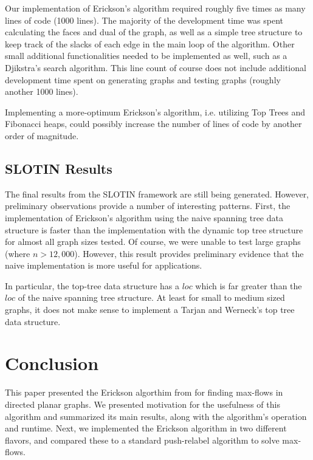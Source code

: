 \documentclass[12pt]{article}
\begin{document}
Our implementation of Erickson's algorithm required roughly five times as many lines of code (1000 lines).  The majority of the development time was spent calculating the faces and dual of the graph, as well as a simple tree structure to keep track of the slacks of each edge in the main loop of the algorithm.  Other small additional functionalities needed to be implemented as well, such as a Djikstra's search algorithm.  This line count of course does not include additional development time spent on generating graphs and testing graphs (roughly another 1000 lines).

Implementing a more-optimum Erickson's algorithm, i.e. utilizing Top Trees and Fibonacci heaps, could possibly increase the number of lines of code by another order of magnitude.

\subsection{SLOTIN Results}

The final results from the SLOTIN framework are still being generated. However, preliminary observations provide a number of interesting patterns. First, the implementation of Erickson's algorithm using the naive spanning tree data structure is faster than the implementation with the dynamic top tree structure for almost all graph sizes tested. Of course, we were unable to test large graphs (where $n > 12,000$). However, this result provides preliminary evidence that the naive implementation is more useful for applications. 

In particular, the top-tree data structure has a $loc$ which is far greater than the $loc$ of the naive spanning tree structure. At least for small to medium sized graphs, it does not make sense to implement a Tarjan and Werneck's top tree data structure.

\section{Conclusion}

This paper presented the Erickson algorthim from \cite{erickson2010} for finding max-flows in directed planar graphs. We presented motivation for the usefulness of this algorithm and summarized its main results, along with the algorithm's operation and runtime. Next, we implemented the Erickson algorithm in two different flavors, and compared these to a standard push-relabel algorithm to solve max-flows. 
\end{document}
